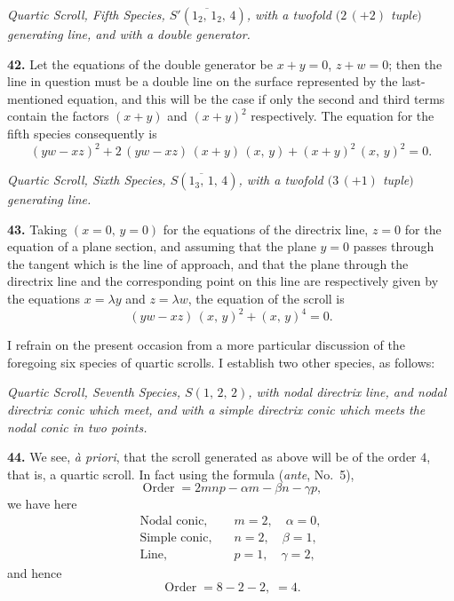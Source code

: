\documentclass[11pt,a4paper]{article}
\providecommand{\Order}{\operatorname{Order}}
\begin{document}
\bigskip

\begin{center}
\textit{Quartic Scroll, Fifth Species, $S'(\overline{1_{2},\,1_{2}},\,4)$, with a twofold $(2\,(+2)$ tuple$)$ generating line, and with a double generator.}
\end{center}

\textbf{42.} Let the equations of the double generator be $x + y = 0$, $z + w = 0$; then the line in question must be a double line on the surface represented by the last-mentioned equation, and this will be the case if only the second and third terms contain the factors $(x + y)$ and $(x + y)^{2}$ respectively. The equation for the fifth species consequently is
\[
(yw - xz)^{2} + 2\,(yw - xz)\,(x + y)\,(x,\,y) + (x + y)^{2}\,(x,\,y)^{2} = 0.
\]

\bigskip

\begin{center}
\textit{Quartic Scroll, Sixth Species, $S(\overline{1_{3},\,1},\,4)$, with a twofold $(3\,(+1)$ tuple$)$ generating line.}
\end{center}

\textbf{43.} Taking $(x = 0,\,y = 0)$ for the equations of the directrix line, $z = 0$ for the equation of a plane section, and assuming that the plane $y = 0$ passes through the tangent which is the line of approach, and that the plane through the directrix line and the corresponding point on this line are respectively given by the equations $x = \lambda y$ and $z = \lambda w$, the equation of the scroll is
\[
(yw - xz)\,(x,\,y)^{2} + (x,\,y)^{4} = 0.
\]

\medskip

I refrain on the present occasion from a more particular discussion of the foregoing six species of quartic scrolls. I establish two other species, as follows:

\bigskip

\begin{center}
\textit{Quartic Scroll, Seventh Species, $S(1,\,2,\,2)$, with nodal directrix line, and nodal directrix conic which meet, and with a simple directrix conic which meets the nodal conic in two points.}
\end{center}

\textbf{44.} We see, \textit{\`a priori}, that the scroll generated as above will be of the order $4$, that is, a quartic scroll. In fact using the formula (\textit{ante}, No.~5),
\[
\Order = 2mnp - \alpha m - \beta n - \gamma p,
\]
we have here
\[
\begin{aligned}
\text{Nodal conic,}  &\quad m = 2,\quad \alpha = 0,\\
\text{Simple conic,} &\quad n = 2,\quad \beta = 1,\\
\text{Line,}         &\quad p = 1,\quad \gamma = 2,
\end{aligned}
\]
and hence
\[
\Order = 8 - 2 - 2,\; = 4.
\]
\end{document}
